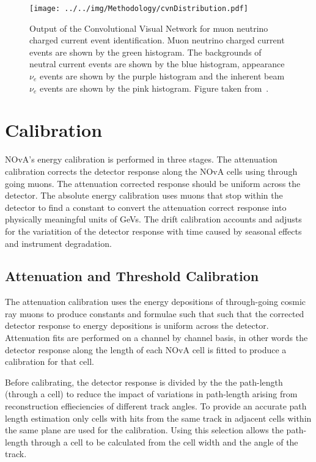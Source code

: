 \begin{figure}
  \centering
  \texttt{[image: ../../img/Methodology/cvnDistribution.pdf]}
  \caption{
    Output of the Convolutional Visual Network  for muon neutrino
    charged current event identification. Muon neutrino
    charged current events are shown by the green histogram. The
    backgrounds of neutral current
    events are shown by the blue histogram, appearance $\nu_e$ events
    are shown by the purple histogram and the inherent beam $\nu_e$
    events are shown by the pink histogram. Figure taken
    from~\cite{aurisano2016convolutional}.   
  } 
  \label{fig:cvnDist}
\end{figure}



\section{Calibration}\label{sec:calibration}

NOvA's energy calibration is performed in three stages.
The attenuation calibration corrects the detector response along the
NOvA cells using through going muons. The attenuation corrected
response should be uniform across the detector. 
The absolute energy calibration uses muons that stop within the
detector to find a constant to convert the attenuation correct
response into physically meaningful units of GeVs.
The drift calibration accounts and adjusts for the variatition of the
detector response with time caused by seasonal effects and instrument
degradation. 


\subsection{Attenuation and Threshold Calibration}

The attenuation calibration uses the energy depositions of
through-going cosmic ray muons to produce constants and formulae such
that such that the corrected detector response to energy depositions
is uniform across the detector. 
Attenuation fits are performed on a channel by channel basis, in other
words the detector response along the length of each NOvA cell is
fitted to produce a calibration for that cell. 

Before calibrating, the detector response is divided by the the
path-length (through a cell) to reduce the impact of variations in
path-length arising from reconstruction effieciencies of different
track angles. 
To provide an accurate path length estimation only cells with hits
from the same track in adjacent cells within the same plane are used
for the calibration. Using this selection allows the path-length
through a cell to be calculated from the cell width and the angle of
the track. 

